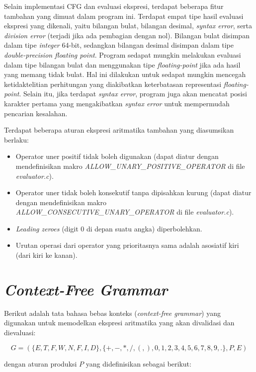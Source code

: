 \documentclass[a4paper,titlepage]{article}
\begin{document}
		Selain implementasi CFG dan evaluasi ekspresi, terdapat beberapa fitur tambahan yang dimuat dalam program ini. Terdapat empat tipe hasil evaluasi ekspresi yang dikenali, yaitu bilangan bulat, bilangan desimal, \textit{syntax error}, serta \textit{division error} (terjadi jika ada pembagian dengan nol). Bilangan bulat disimpan dalam tipe \textit{integer} 64-bit, sedangkan bilangan desimal disimpan dalam tipe \textit{double-precision floating point}. Program sedapat mungkin melakukan evaluasi dalam tipe bilangan bulat dan menggunakan tipe \textit{floating-point} jika ada hasil yang memang tidak bulat. Hal ini dilakukan untuk sedapat mungkin mencegah ketidaktelitian perhitungan yang diakibatkan keterbatasan representasi \textit{floating-point}. Selain itu, jika terdapat \textit{syntax error}, program juga akan mencatat posisi karakter pertama yang mengakibatkan \textit{syntax error} untuk mempermudah pencarian kesalahan.

		\noindent Terdapat beberapa aturan ekspresi aritmatika tambahan yang diasumsikan berlaku:

		\begin{itemize}
			\item Operator uner positif tidak boleh digunakan (dapat diatur dengan mendefinisikan makro \textit{ALLOW\_UNARY\_POSITIVE\_OPERATOR} di file \textit{evaluator.c}).
			\item Operator uner tidak boleh konsekutif tanpa dipisahkan kurung (dapat diatur dengan mendefinisikan makro \textit{ALLOW\_CONSECUTIVE\_UNARY\_OPERATOR} di file \textit{evaluator.c}).
			\item \textit{Leading zeroes} (digit 0 di depan suatu angka) diperbolehkan.
			\item Urutan operasi dari operator yang prioritasnya sama adalah asosiatif kiri (dari kiri ke kanan).
		\end{itemize}

	\section{\textit{Context-Free Grammar}}

		Berikut adalah tata bahasa bebas konteks (\textit{context-free grammar}) yang digunakan untuk memodelkan ekspresi aritmatika yang akan divalidasi dan dievaluasi:

		\[G = (\{E, T, F, W, N, F, I, D\}, \{+, -, *, /, (, ), 0, 1, 2, 3, 4, 5, 6, 7, 8, 9, .\}, P, E)\]

		\noindent dengan aturan produksi $P$ yang didefinisikan sebagai berikut:
\end{document}
